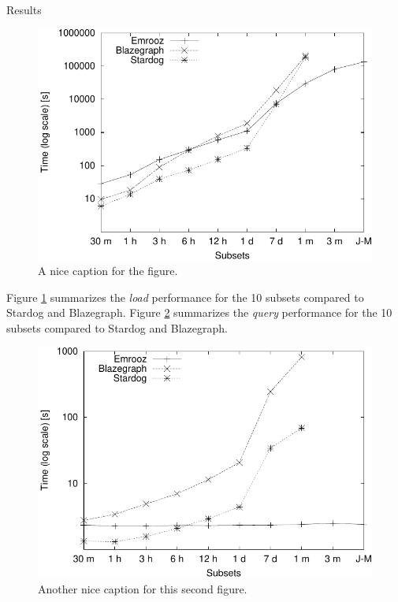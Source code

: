 \documentclass[final]{beamer}
\newlength{\twocolwid}
\begin{document}
\begin{frame}[t]
\begin{columns}[t]
\begin{column}{\twocolwid}
\begin{block}{Results}
\begin{figure}
  \centering
  \includegraphics[scale=2]{load-performance-plot.pdf}
	\caption{A nice caption for the figure.}
	\label{fig:load-performance-plot}
\end{figure}

Figure \ref{fig:load-performance-plot} summarizes the \emph{load} performance for the 10 subsets compared to Stardog and Blazegraph. Figure \ref{fig:query-performance-plot} summarizes the \emph{query} performance for the 10 subsets compared to Stardog and Blazegraph. 

\begin{figure}
	\centering
	\includegraphics[scale=2]{query-performance-plot.pdf}
	\caption{Another nice caption for this second figure.}
	\label{fig:query-performance-plot}
\end{figure}


\end{block}
\end{column}
\end{columns}
\end{frame}
\end{document}
